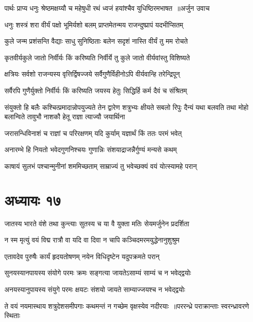 \threelineshloka
{पार्थः प्राप्य धनुः श्रेष्ठमक्षय्यौ च महेषुधी}
{रथं ध्वजं हयांश्चैव युधिष्ठिरमभाषत ॥अर्जुन उवाच}
{}


\threelineshloka
{धनुः शस्त्रं शरा वीर्यं पक्षो भूमिर्यशो बलम्}
{प्राप्तमेतन्मय राजन्दुष्प्रापं यदभीप्सितम्}
{}


\threelineshloka
{कुले जन्म प्रशंसन्ति वैद्याः साधु सुनिष्ठिताः}
{बलेन सदृशं नास्ति वीर्यं तु मम रोचते}
{}


\twolineshloka
{कृतवीर्यकुले जातो निर्वीर्यः किं करिष्यति}
{निर्वीर्ये तु कुले जातो वीर्यवांस्तु विशिष्यते}


\twolineshloka
{क्षत्रियः सर्वशो राजन्यस्य वृत्तिर्द्विषज्जये}
{सर्वैगुणैर्विहीनोऽपि वीर्यवान्हि तरेन्द्रिपून्}


\twolineshloka
{सर्वैरपि गुणैर्युक्तो निर्वीर्यः किं करिष्यति}
{जयस्य हेतुः सिद्धिर्हि कर्म दैवं च संश्रितम्}


संयुक्तो हि बलैः कश्चित्प्रमादान्नोपयुज्यते
तेन द्वारेण शत्रुभ्यः क्षीयते सबलो रिपुः
\twolineshloka
{दैन्यं यथा बलवति तथा मोहो बलान्विते}
{तावुभौ नाशकौ हेतू राज्ञा त्याज्यौ जयार्थिना}


\twolineshloka
{जरासन्धिविनाशं च राज्ञां च परिरक्षणम्}
{यदि कुर्याम् यज्ञार्थं किं ततः परमं भवेत्}


\twolineshloka
{अनारम्भे हि नियतो भवेदगुणनिश्चयः}
{गुणान्निः संशयाद्राजन्नैर्गुण्यं मन्यसे कथम्}


\twolineshloka
{काषायं सुलभं पश्चान्मुनीनां शममिच्छताम्}
{साम्राज्यं तु भवेच्छक्यं वयं योत्स्यामहे परान्}


\chapter{अध्यायः १७}
\twolineshloka
{जातस्य भारते वंशे तथा कुन्त्याः सुतस्य च}
{या वै युक्ता मतिः सेयमर्जुनेन प्रदर्शिता}


\twolineshloka
{न स्म मृत्युं वयं विद्म रात्रौ वा यदि वा दिवा}
{न चापि कञ्चिदमरमयुद्धेनानुशुश्रुम}


\twolineshloka
{एतावदेव पुरुषैः कार्यं हृदयतोषणम्}
{नयेन विधिदृष्टेन यदुपक्रमते परान्}


\twolineshloka
{सुनयस्यानपायस्य संयोगे परमः क्रमः}
{सङ्गत्या जायतेऽसाम्यं साम्यं च न भवेद्द्वयोः}


\twolineshloka
{अनयस्यानुपायस्य संयुगे परमः क्षयटः}
{संशयो जायते साम्याज्जयश्च न भवेद्द्वयोः}


\twolineshloka
{ते वयं नयमास्थाय शत्रुदेशसमीपगाः}
{कथमन्तं न गच्छेम वृक्षस्येव नदीरयाः ॥पररन्ध्रे पराक्रान्ताः स्वरन्ध्रावरणे स्थिताः}


